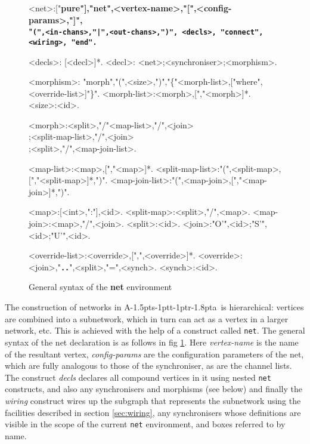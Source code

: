\documentclass[11pt]{report}
\def\ak{{\textsf{A\kern-1.5pts\kern-1ptt\kern-1ptr\kern-1.8pta}}\kern-2pt{\it K\kern-2ptahn}}
\begin{document}
\begin{figure}[t]
\begin{framed}
\small
\begin{grammar}

<net>:["\bf pure"],"\bf net",<vertex-name>,"[",<config-params>,"]",\\
	"\tt\bf (",<in-chans>,"\tt |",<out-chans>,"\tt\bf )", <decls>, "\bf connect", <wiring>, "\bf end".

<decls>: [<decl>]*.
<decl>: <net>;<synchroniser>;<morphism>.

<morphism>: "morph","(",<size>,")","\{"<morph-list>,["where",<override-list>]"\}".
<morph-list>:<morph>,[","<morph>]*.
<size>:<id>.

<morph>:<split>,"/"<map-list>,"/",<join>\\
	;<split-map-list>,"/",<join>\\
	;<split>,"/",<map-join-list>.

<map-list>:<map>,[","<map>]*.
<split-map-list>:"(",<split-map>,[","<split-map>]*,")".
<map-join-list>:"(",<map-join>,[","<map-join>]*,")".

<map>:[<int>,":"],<id>.
<split-map>:<split>,"/",<map>.
<map-join>:<map>,"/",<join>.
<split>:<id>.
<join>:"O'",<id>;"S'",<id>;"U'",<id>.

<override-list>:<override>,[",",<override>]*.
<override>:<join>,"{\tt\bf ..}",<split>,"=",<synch>.
<synch>:<id>.

\end{grammar}
\end{framed}
\caption{General syntax of the {\bf net} environment\label{fig:net}}
\end{figure}


The construction of networks in \ak\ is hierarchical: vertices are combined into a subnetwork, which in turn can act as a vertex in a larger network, etc. This is achieved with the help of a construct called \verb$net$. The general syntax of the net declaration is as follows in fig \ref{fig:net}.
Here {\it vertex-name} is the name of the resultant vertex, {\it config-params} are the configuration parameters of the net, which are fully analogous to those of the synchroniser, as are the channel lists.
The construct {\it decls} declares all compound vertices in it using nested \verb$net$ constructs, and also any synchronisers and morphisms (see below) 
and finally the {\it wiring} construct wires up the subgraph that represents the subnetwork using the facilities
described in section \ref{sec:wiring}, any synchronisers whose definitions are visible in the scope of the current \verb$net$ environment, 
and boxes referred to by name. 
\end{document}
